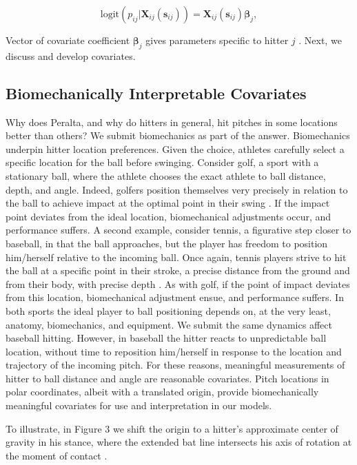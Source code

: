 \begin{equation}
\text{logit}(p_{ij}|\pmb{X}_{ij}(\pmb{s}_{ij})) = \pmb{X}_{ij}(\pmb{s}_{ij}) \pmb{\beta}_{j},
\end{equation}

Vector of covariate coefficient $\pmb{\beta}_{j}$ gives  parameters specific to hitter $j$ \citep{Myers2012}. Next, we discuss and develop covariates.

\subsection{Biomechanically Interpretable Covariates} %

Why does Peralta, and why do hitters in general, hit pitches in some locations better than others? We submit biomechanics as part of the answer. Biomechanics underpin hitter location preferences. Given the choice, athletes carefully select a specific location for the ball before swinging. Consider golf, a sport with a stationary ball, where the athlete chooses the exact athlete to ball distance, depth, and angle. Indeed, golfers position themselves very precisely in relation to the ball to achieve impact at the optimal point in their swing \citep{Cochran2005}. If the impact point deviates from the ideal location, biomechanical adjustments occur, and performance suffers. A second example, consider tennis, a figurative step closer to baseball, in that the ball approaches, but the player has freedom to position him/herself relative to the incoming ball. Once again, tennis players strive to hit the ball at a specific point in their stroke, a precise distance from the ground and from their body, with precise depth \citep{Elliott2006}. As with golf, if the point of impact deviates from this location, biomechanical adjustment ensue, and performance suffers. In both sports the ideal player to ball positioning depends on, at the very least, anatomy, biomechanics, and equipment. We submit the same dynamics affect baseball hitting. However, in baseball the hitter reacts to unpredictable ball location, without time to reposition him/herself in response to the location and trajectory of the incoming pitch. For these reasons, meaningful measurements of hitter to ball distance and angle are reasonable covariates. Pitch locations in polar coordinates, albeit with a translated origin, provide biomechanically meaningful covariates for use and interpretation in our models.

To illustrate, in Figure 3 we shift the origin to a hitter's approximate center of gravity in his stance, where the extended bat line intersects his axis of rotation at the moment of contact \citep{Welch1995}.

